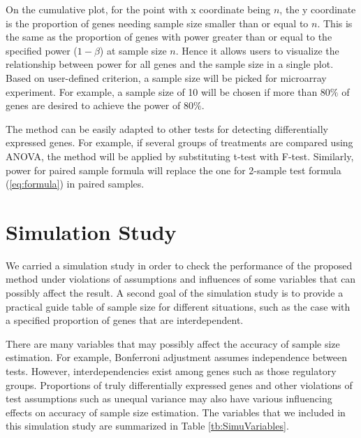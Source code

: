 \documentclass{bioinfo}
\begin{document}
On the cumulative plot, for the point with x coordinate being $n$,
the y coordinate is the proportion of genes needing sample size
smaller than or equal to $n$. This is the same as the proportion
of genes with power greater than or equal to the specified power
($1- \beta$) at sample size $n$. Hence it allows users to
visualize the relationship between power for all genes and the
sample size in a single plot. Based on user-defined criterion, a
sample size will be picked for microarray experiment. For example,
a sample size of 10 will be chosen if more than $80\%$ of genes
are desired to achieve the power of $80\%$.

The method can be easily adapted to other tests for detecting
differentially expressed genes. For example, if several groups of
treatments are compared using ANOVA, the method will be applied by
substituting t-test  with F-test. Similarly, power for paired
sample formula will replace the one for 2-sample test formula
(\ref{eq:formula}) in paired samples.


\section{Simulation Study}
We carried a simulation study in order to check the performance of the proposed method under violations of assumptions and
influences of some variables that can possibly affect the result. A second goal of the simulation study is to provide a
practical guide table of sample size for different situations, such as the case with a specified proportion of genes that are
interdependent.

There are many variables that may possibly affect the accuracy of sample size estimation. For example, Bonferroni adjustment
assumes independence between tests. However, interdependencies exist among genes such as those regulatory groups. Proportions
of truly differentially expressed genes and other violations of test assumptions such as unequal variance may also have various
influencing effects on accuracy of sample size estimation. The variables that we included in this simulation study are
summarized in Table \ref{tb:SimuVariables}.
\end{document}
